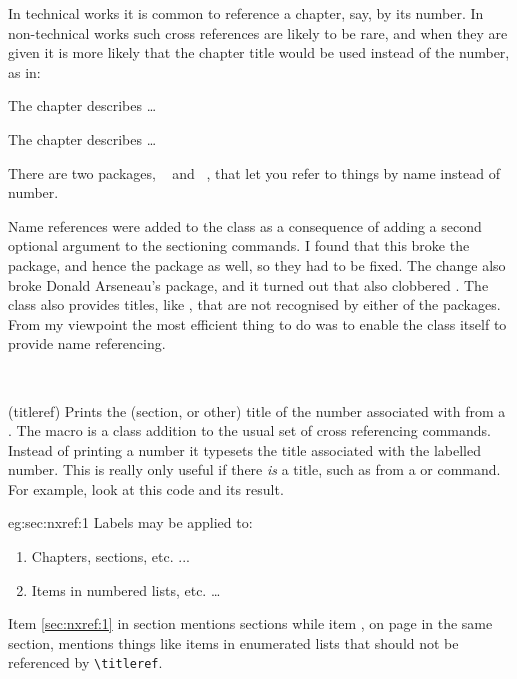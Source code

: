     In technical works it is common to reference a chapter, say, by its
number. In non-technical works such cross references are likely to be
rare, and when they are given it is more likely that the chapter title
would be used instead of the number, as in:
\begin{lcode}
The chapter \textit{} describes \ldots
\end{lcode}
The chapter \textit{} describes \ldots

    There are two packages, ~\cite{NAMEREF} and 
~\cite{TITLEREF},
 that let you refer to things by name instead of number.

    Name references were added to the class as a consequence of adding
a second optional argument to the sectioning commands. I found
that this broke the  package, and hence the
 package as well, so they had to be fixed. The change 
also broke Donald Arseneau's  package, and it turned out
that  also clobbered . The class also
provides titles, like \cmd{\poemtitle}, that are not recognised by
either of the packages. From my viewpoint the most efficient
thing to do was to enable the class itself to provide name 
referencing.


\begin{syntax}
\cmd{\titleref} \\
\end{syntax}
\glossary(titleref)%
  {}%
  {Prints the (section, or other) title of the number associated 
   with  from a .}
The macro \cmd{\titleref} is a class addition to the usual set of
cross referencing commands. Instead of printing a number it typesets
the title associated with the labelled number. This is really only useful
if there \emph{is} a title, such as from a \cmd{\caption} or
\cmd{\section} command. For example, look at this code 
and its result.

\begin{egsource}{eg:sec:nxref:1}
Labels may be applied to:
\begin{enumerate}
\item Chapters, sections, etc.            \label{sec:nxref:1}
...
\item Items in numbered lists, etc. \ldots \label{sec:nxref:5}
\end{enumerate}
Item \ref{sec:nxref:1} in section \textit{} 
mentions sections while item , on page 
\pageref{sec:nxref:5} in the same section, mentions things like
items in enumerated lists that should not be referenced 
by \verb?\titleref?.
\end{egsource}

